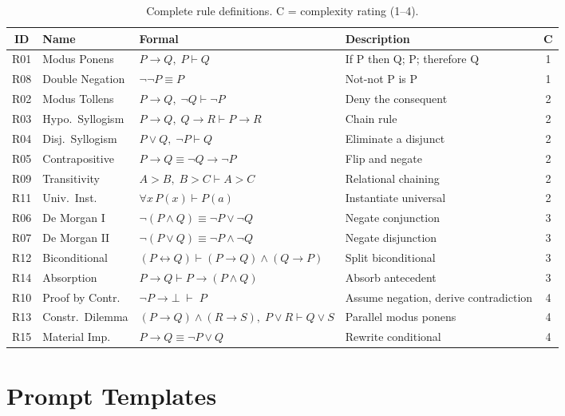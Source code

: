 \documentclass{article}
\begin{document}
\begin{table}[h]
\centering
\small
\begin{tabular}{clll c}
\toprule
\textbf{ID} & \textbf{Name} & \textbf{Formal} & \textbf{Description} & \textbf{C} \\
\midrule
R01 & Modus Ponens & $P{\to}Q,\; P \vdash Q$ & If P then Q; P; therefore Q & 1 \\
R08 & Double Negation & $\neg\neg P \equiv P$ & Not-not P is P & 1 \\
R02 & Modus Tollens & $P{\to}Q,\; \neg Q \vdash \neg P$ & Deny the consequent & 2 \\
R03 & Hypo.\ Syllogism & $P{\to}Q,\; Q{\to}R \vdash P{\to}R$ & Chain rule & 2 \\
R04 & Disj.\ Syllogism & $P{\lor}Q,\; \neg P \vdash Q$ & Eliminate a disjunct & 2 \\
R05 & Contrapositive & $P{\to}Q \equiv \neg Q{\to}\neg P$ & Flip and negate & 2 \\
R09 & Transitivity & $A{>}B,\; B{>}C \vdash A{>}C$ & Relational chaining & 2 \\
R11 & Univ.\ Inst. & $\forall x\, P(x) \vdash P(a)$ & Instantiate universal & 2 \\
R06 & De Morgan I & $\neg(P{\land}Q) \equiv \neg P{\lor}\neg Q$ & Negate conjunction & 3 \\
R07 & De Morgan II & $\neg(P{\lor}Q) \equiv \neg P{\land}\neg Q$ & Negate disjunction & 3 \\
R12 & Biconditional & $(P{\leftrightarrow}Q) \vdash (P{\to}Q){\land}(Q{\to}P)$ & Split biconditional & 3 \\
R14 & Absorption & $P{\to}Q \vdash P{\to}(P{\land}Q)$ & Absorb antecedent & 3 \\
R10 & Proof by Contr. & $\neg P \to \bot \;\vdash\; P$ & Assume negation, derive contradiction & 4 \\
R13 & Constr.\ Dilemma & $(P{\to}Q){\land}(R{\to}S),\; P{\lor}R \vdash Q{\lor}S$ & Parallel modus ponens & 4 \\
R15 & Material Imp. & $P{\to}Q \equiv \neg P{\lor}Q$ & Rewrite conditional & 4 \\
\bottomrule
\end{tabular}
\caption{Complete rule definitions. C = complexity rating (1--4).}
\label{tab:full_rules}
\end{table}

\section{Prompt Templates}
\label{app:prompts}
\end{document}
